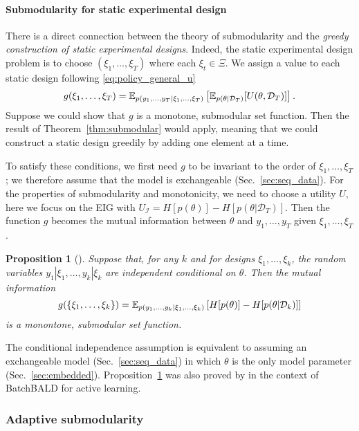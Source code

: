 \documentclass[a4paper, 10pt]{report}
\theoremstyle{plain}
\newtheorem{proposition}[theorem]{Proposition}
\begin{document}
	\paragraph{Submodularity for static experimental design}
	There is a direct connection between the theory of submodularity and the \emph{greedy construction of static experimental designs}.
	Indeed, the static experimental design problem is to choose $(\xi_1,\dots,\xi_T)$ where each $\xi_t \in \Xi$.
	We assign a value to each static design following \eqref{eq:policy_general_u}
	\begin{equation}
	g(\xi_1,\dots,\xi_T) = \mathbb{E}_{p(y_1,\dots,y_T|\xi_1,\dots,\xi_T)}\left[  \mathbb{E}_{p(\theta|\mathcal{D}_T)}[U(\theta, \mathcal{D}_T)] \right].
	\end{equation}
	Suppose we could show that $g$ is a monotone, submodular set function. 
	Then the result of Theorem~\ref{thm:submodular} would apply, meaning that we could construct a static design greedily by adding one element at a time.
	
	To satisfy these conditions, we first need $g$ to be invariant to the order of $\xi_1,\dots,\xi_T$; we therefore assume that the model is exchangeable (Sec.~\ref{sec:seq_data}).
	For the properties of submodularity and monotonicity, we need to choose a utility $U$, here we focus on the EIG with $U_\mathcal{I} = H[p(\theta)]-H[p(\theta|\mathcal{D}_T)]$.
	Then the function $g$ becomes the mutual information between $\theta$ and $y_1,\dots,y_T$ given $\xi_1,\dots,\xi_T$.
	\begin{proposition}[\citet{krause2012near}]
		\label{prop:submodular_mi}
		Suppose that, for any $k$ and for designs $\xi_1,\dots,\xi_k$, the random variables $y_1|\xi_1,\dots,y_k|\xi_k$ are independent conditional on $\theta$.
		Then the mutual information 
		\begin{equation}
		g(\{\xi_1,\dots,\xi_k\}) = \mathbb{E}_{p(y_1,\dots,y_k|\xi_1,\dots,\xi_k)}\left[ H[p(\theta)]-H[p(\theta|\mathcal{D}_k)] \right]
		\end{equation}
		is a monontone, submodular set function.
	\end{proposition}
	The conditional independence assumption is equivalent to assuming an exchangeable model (Sec.~\ref{sec:seq_data}) in which $\theta$ is the only model parameter (Sec.~\ref{sec:embedded}).
	Proposition~\ref{prop:submodular_mi} was also proved by \citet{kirsch2019batchbald} in the context of BatchBALD for active learning.
	
	
	\subsubsection{Adaptive submodularity}
	
\end{document}
